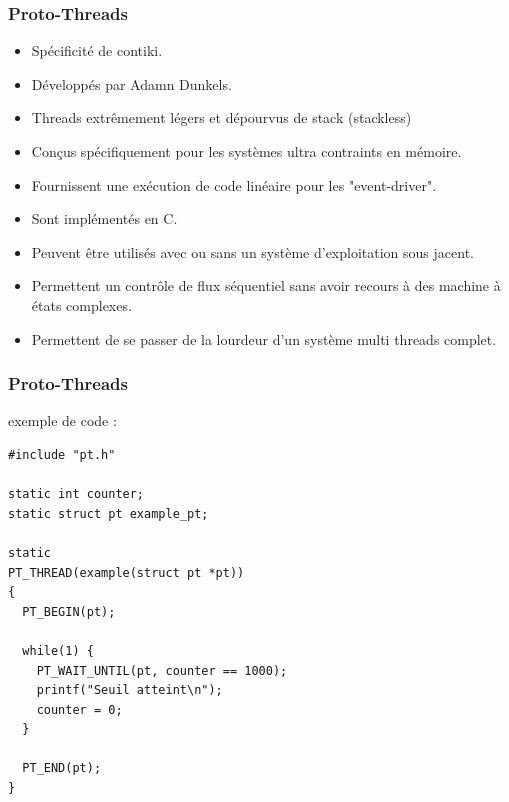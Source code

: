 \documentclass{smilebeamer}
\begin{document}
\begin{frame}

\frametitle{Proto-Threads}
\begin{itemize}
\item Spécificité de contiki.
\item Développés par Adamn Dunkels.
\item  Threads extrêmement légers et dépourvus de stack (stackless)
\item  Conçus spécifiquement pour les systèmes ultra contraints en mémoire.
\item  Fournissent une exécution de code linéaire pour les "event-driver".
\item  Sont implémentés en C.
\item Peuvent être utilisés avec ou sans un système d'exploitation sous jacent.
\item Permettent un contrôle de flux séquentiel sans avoir recours à des machine à états complexes.
\item Permettent de se passer de la lourdeur d'un système multi threads complet.
\end{itemize}
\end{frame}


\begin{frame}[containsverbatim]

\frametitle{Proto-Threads}

exemple de code :
  \begin{verbatim}
#include "pt.h"

static int counter;
static struct pt example_pt;

static
PT_THREAD(example(struct pt *pt))
{
  PT_BEGIN(pt);

  while(1) {
    PT_WAIT_UNTIL(pt, counter == 1000);
    printf("Seuil atteint\n");
    counter = 0;
  }

  PT_END(pt);
}
  \end{verbatim}
\end{frame}
\end{document}
